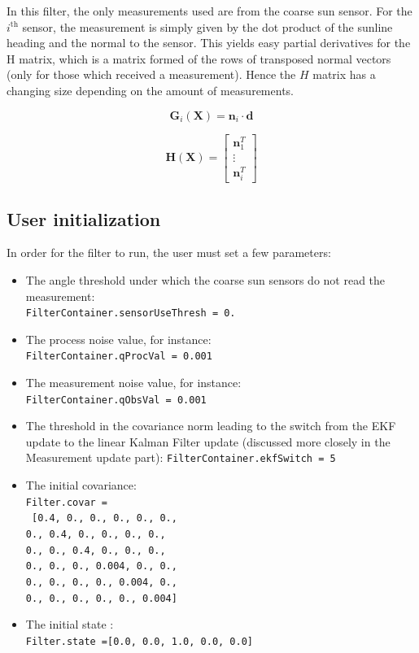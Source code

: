 \documentclass[]{BasiliskReportMemo}
\begin{document}
In this filter, the only measurements used are from the coarse sun sensor. For the $i^\mathrm{th}$ sensor, the measurement is simply given by the dot product of the sunline heading and the normal to the sensor. This yields easy partial derivatives for the H matrix, which is a matrix formed of the rows of transposed normal vectors (only for those which received a measurement). Hence the $H$ matrix has a changing size depending on the amount of measurements. 

\begin{equation}\label{eq:meas}
\bm G_i(\bm X) = \bm n_i \cdot \bm d
\end{equation}

\begin{equation}\label{eq:Hmat}
\bm H(\bm X) = \begin{bmatrix} \bm n_1^T \\ \vdots \\ \bm n_i^T \end{bmatrix} 
\end{equation}

\subsection{User initialization}

In order for the filter to run, the user must set a few parameters:

\begin{itemize}
\item The angle threshold under which the coarse sun sensors do not read the measurement:  \\
\texttt{FilterContainer.sensorUseThresh = 0.}
\item The process noise value, for instance: \\
 \texttt{FilterContainer.qProcVal = 0.001}
\item The measurement noise value, for instance: \\
 \texttt{FilterContainer.qObsVal = 0.001}
\item The threshold in the covariance norm leading to the switch from the EKF update to the linear Kalman Filter update (discussed more closely in the Measurement update part):
 \texttt{FilterContainer.ekfSwitch = 5}
\item The initial covariance: \\
 \texttt{Filter.covar =} \\
  \texttt{ [0.4, 0., 0., 0., 0., 0.,\\
   0., 0.4, 0., 0., 0., 0., \\
   0., 0., 0.4, 0., 0., 0.,\\
    0., 0., 0., 0.004, 0., 0.,\\
    0., 0., 0., 0., 0.004, 0., \\
    0., 0., 0., 0., 0., 0.004]}
 \item The initial state :\\
 \texttt{Filter.state =[0.0, 0.0, 1.0, 0.0, 0.0]}
\end{itemize}
\end{document}
